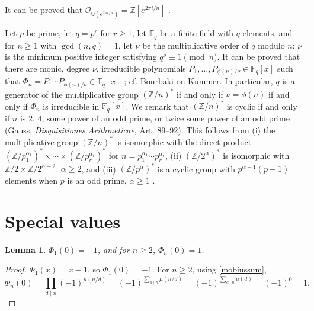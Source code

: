 \documentclass{article}
\newtheorem{lemma}[theorem]{Lemma}
\theoremstyle{definition}
\begin{document}
It can be proved that $\mathcal{O}_{\mathbb{Q}(e^{2\pi i/n})} = \mathbb{Z}[e^{2\pi i/n}]$ \cite[p.~60, Proposition 10.2]{neukirch}.







Let $p$ be prime, let $q=p^r$ for $r \geq 1$,  let $\mathbb{F}_q$ be a finite field with $q$ elements,
and for $n \geq 1$ with $\gcd(n,q)=1$, let $\nu$ be the multiplicative order of $q$ modulo $n$: $\nu$ is the minimum positive
integer satisfying $q^\nu \equiv 1 \pmod{n}$. It can be proved that
there are monic, degree $\nu$, irreducible polynomials
$P_1,\ldots,P_{\phi(n)/\nu} \in \mathbb{F}_q[x]$ such that
$\Phi_n = P_1 \cdots P_{\phi(n)/\nu} \in \mathbb{F}_q[x]$ \cite[p.~65, Theorem 2.47]{lidl}; cf.
Bourbaki \cite[p.~581]{commutative} on Kummer.
In particular, $q$ is a generator of the multiplicative group $(\mathbb{Z}/n)^*$ if and only if
$\nu=\phi(n)$ if and only if $\Phi_n$ is irreducible in $\mathbb{F}_q[x]$. We remark that $(\mathbb{Z}/n)^*$ is cyclic if and only if
$n$ is $2$, $4$, some power of an odd prime, or twice some power of an odd prime (Gauss, {\em Disquisitiones Arithmeticae}, Art. 89--92).
This 
 follows from (i) the multiplicative group $(\mathbb{Z}/n)^*$ is isomorphic with the direct product
$(\mathbb{Z}/p_1^{\alpha_1})^* \times \cdots \times (\mathbb{Z}/p_r^{\alpha_r})^*$ for $n=p_1^{\alpha_1} \cdots p_r^{\alpha_r}$,
(ii) $(\mathbb{Z}/2^\alpha)^*$ is isomorphic with $\mathbb{Z}/2 \times \mathbb{Z}/2^{\alpha-2}$, $\alpha \geq 2$,
and (iii) $(\mathbb{Z}/p^\alpha)^*$ is a cyclic group with $p^{\alpha-1}(p-1)$ elements when $p$ is an odd
prime, $\alpha \geq 1$ \cite[p.~314, Corollary 20]{dummit}.








\section{Special values}
\begin{lemma}
$\Phi_1(0)=-1$, and for $n \geq 2$, $\Phi_n(0)=1$.
\label{Phi0}
\end{lemma}
\begin{proof}
$\Phi_1(x)=x-1$, so $\Phi_1(0)=-1$. For $n \geq 2$, using \eqref{mobiussum},
\[
\Phi_n(0) = \prod_{d \mid n} (-1)^{\mu(n/d)} = (-1)^{\sum_{d \mid n} \mu(n/d)} = (-1)^{\sum_{d \mid n} \mu(d)}
=(-1)^0 = 1.
\]
\end{proof}
\end{document}
